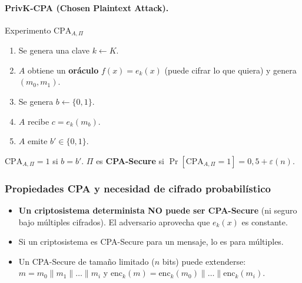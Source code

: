 \documentclass[../main.tex]{subfiles}
\begin{document}
\paragraph{PrivK-CPA (Chosen Plaintext Attack).}
\begin{definicion}{Experimento $\text{CPA}_{A,\Pi}$}
\begin{enumerate}[nosep]
  \item Se genera una clave $k \leftarrow K$.
  \item $A$ obtiene un \textbf{oráculo} $f(x)=e_k(x)$ (puede cifrar lo que
        quiera) y genera $(m_0, m_1)$.
  \item Se genera $b \leftarrow \{0,1\}$.
  \item $A$ recibe $c = e_k(m_b)$.
  \item $A$ emite $b' \in \{0,1\}$.
\end{enumerate}
$\text{CPA}_{A,\Pi}=1$ si $b=b'$. $\Pi$ es \textbf{CPA-Secure} si
$\Pr[\text{CPA}_{A,\Pi}{=}1]=0{,}5+\varepsilon(n)$.
\end{definicion}

\subsubsection{Propiedades CPA y necesidad de cifrado probabilístico}

\begin{destacado}
\begin{itemize}[nosep]
  \item \textbf{Un criptosistema determinista NO puede ser CPA-Secure} (ni
        seguro bajo múltiples cifrados). El adversario aprovecha que
        $e_k(x)$ es constante.
  \item Si un criptosistema es CPA-Secure para un mensaje, lo es para
        múltiples.
  \item Un CPA-Secure de tamaño limitado ($n$ bits) puede extenderse:
        $m=m_0\|m_1\|\dots\|m_i$ y
        $\text{enc}_k(m)=\text{enc}_k(m_0)\|\dots\|\text{enc}_k(m_i)$.
\end{itemize}
\end{destacado}
\end{document}
